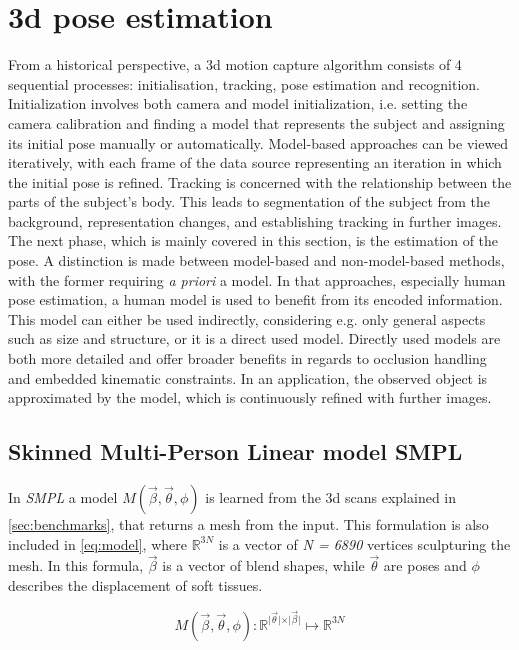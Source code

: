 \section{3d pose estimation}
From a historical perspective, a 3d motion capture algorithm consists of 4 sequential processes: initialisation, tracking, pose estimation and recognition. Initialization involves both camera and model initialization, i.e. setting the camera calibration and finding a model that represents the subject and assigning its initial pose manually or automatically. Model-based approaches can be viewed iteratively, with each frame of the data source representing an iteration in which the initial pose is refined. Tracking is concerned with the relationship between the parts of the subject's body. This leads to segmentation of the subject from the background, representation changes, and establishing tracking in further images. The next phase, which is mainly covered in this section, is the estimation of the pose. A distinction is made between model-based and non-model-based methods, with the former requiring  \emph{a priori} a model. In that approaches, especially human pose estimation, a human model is used to benefit from its encoded information. This model can either be used indirectly, considering e.g. only general aspects such as size and structure, or it is a direct used model. Directly used models are both more detailed and offer broader benefits in regards to occlusion handling and embedded kinematic constraints. In an application, the observed object is approximated by the model, which is continuously refined with further images.\cite{summary80s}

\subsection{Skinned Multi-Person Linear model SMPL}
In \emph{SMPL} a model $M(\vec{\beta},\vec{\theta},\phi)$ is learned from the 3d scans explained in \autoref{sec:benchmarks}, that returns a mesh from the input. This formulation is also included in \autoref{eq:model}, where $\mathbb{R}^{3N}$ is a vector of \emph{N = 6890} vertices sculpturing the mesh. In this formula, $\vec{\beta}$ is a vector of blend shapes, while $\vec{\theta}$ are poses and $\phi$ describes the displacement of soft tissues.

\begin{equation}
\label{eq:model}
M(\vec{\beta},\vec{\theta},\phi) : \mathbb{R}^{\vert \vec{\theta} \vert \times \vert \vec{\beta} \vert} \mapsto \mathbb{R}^{3N}
\end{equation}

